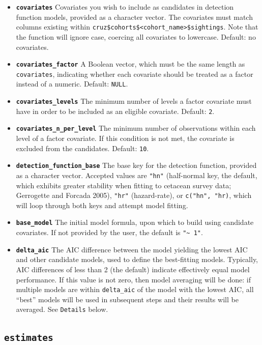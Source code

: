 \documentclass[
]{book}
\begin{document}
\begin{itemize}
\item
  \textbf{\texttt{covariates}} Covariates you wish to include as candidates in detection function models, provided as a character vector. The covariates must match columns existing within \texttt{cruz\$cohorts\$\textless{}cohort\_name\textgreater{}\$sightings}. Note that the function will ignore case, coercing all covariates to lowercase. Default: no covariates.
\item
  \textbf{\texttt{covariates\_factor}} A Boolean vector, which must be the same length as \texttt{covariates}, indicating whether each covariate should be treated as a factor instead of a numeric. Default: \texttt{NULL}.
\item
  \textbf{\texttt{covariates\_levels}} The minimum number of levels a factor covariate must have in order to be included as an eligible covariate. Default: \texttt{2}.
\item
  \textbf{\texttt{covariates\_n\_per\_level}} The minimum number of observations within each level of a factor covariate. If this condition is not met, the covariate is excluded from the candidates. Default: \texttt{10}.
\item
  \textbf{\texttt{detection\_function\_base}} The base key for the detection function, provided as a character vector. Accepted values are \texttt{"hn"} (half-normal key, the default, which exhibits greater stability when fitting to cetacean survey data; Gerrogette and Forcada 2005), \texttt{"hr"} (hazard-rate), or \texttt{c("hn",\ "hr)}, which will loop through both keys and attempt model fitting.
\item
  \textbf{\texttt{base\_model}} The initial model formula, upon which to build using candidate covariates. If not provided by the user, the default is \texttt{"\textasciitilde{}\ 1"}.
\item
  \textbf{\texttt{delta\_aic}} The AIC difference between the model yielding the lowest AIC and other candidate models, used to define the best-fitting models. Typically, AIC differences of less than 2 (the default) indicate effectively equal model performance. If this value is not zero, then model averaging will be done: if multiple models are within \texttt{delta\_aic} of the model with the lowest AIC, all ``best'' models will be used in subsequent steps and their results will be averaged. See \texttt{Details} below.
\end{itemize}

\hypertarget{estimates}{%
\subsection*{\texorpdfstring{\texttt{estimates}}{estimates}}\label{estimates}}
\end{document}

